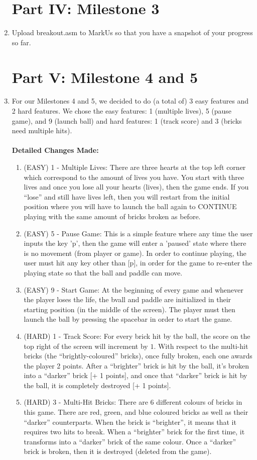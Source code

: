 \documentclass{article}
\begin{document}
\begin{enumerate}
\section{Part IV: Milestone 3}
\item Upload breakout.asm to MarkUs so that you have a snapshot of your progress so far.

\newpage
\section{Part V: Milestone 4 and 5}
\item For our Milestones 4 and 5, we decided to do (a total of) 3 easy features and 2 hard features.
We chose the easy features: 1 (multiple lives), 5 (pause game), and 9 (launch ball)
and hard features: 1 (track score) and 3 (bricks need multiple hits).
\\ \\
\textbf{Detailed Changes Made: }
\begin{enumerate}
  \item (EASY) 1 - Multiple Lives: There are three hearts at the top left corner which correspond to the amount of lives you have. 
  You start with three lives and once you lose all your hearts (lives), then the game ends. 
  If you ``lose'' and still have lives left, then you will restart from the initial position where you will have to launch the ball again to CONTINUE playing with the same amount of bricks broken as before.
  \item (EASY) 5 - Pause Game: This is a simple feature where any time the user inputs the key 'p', then the game will enter a 'paused' state where there is no movement (from player or game). 
  In order to continue playing, the user must hit any key other than [p], in order for the game to re-enter the playing state so that the ball and paddle can move.
  \item (EASY) 9 - Start Game: At the beginning of every game and whenever the player loses the life, the bvall and paddle are initialized in their starting position (in the middle of the screen).
  The player must then launch the ball by pressing the spacebar in order to start the game.
  \item (HARD) 1 - Track Score: For every brick hit by the ball, the score on the top right of the screen will increment by $1$. 
  With respect to the multi-hit bricks (the ``brightly-coloured'' bricks), once fully broken, each one awards the player 2 points. 
  After a ``brighter'' brick is hit by the ball, it's broken into a ``darker'' brick [+ 1 points], and once that ``darker'' brick is hit by the ball, it is completely destroyed [+ 1 points].
  \item (HARD) 3 - Multi-Hit Bricks: There are 6 different colours of bricks in this game. 
  There are red, green, and blue coloured bricks as well as their ``darker'' counterparts. 
  When the brick is ``brighter'', it means that it requires two hits to break.
  When a ``brighter'' brick for the first time, it transforms into a ``darker'' brick of the same colour. 
  Once a ``darker'' brick is broken, then it is destroyed (deleted from the game). 
\end{enumerate}


\end{enumerate}
\end{document}
